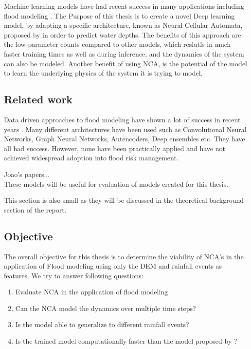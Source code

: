 Machine learning models have had recent success in many applications including flood modeling \cite{russo2023evaluation, karim2023review, chaudhary2022flood}. The Purpose of this thesis is to create a novel Deep learning model, by adapting a specific architecture, known as Neural Cellular Automata, proposed by \citeauthor{growing_nca} \cite{growing_nca} in order to predict water depths. The benefits of this approach are the low-parameter counts compared to other models, which reslutls in much faster training times as well as during inference, and the dynamics of the system can also be modeled. Another benefit of using NCA, is the potential of the model to learn the underlying physics of the system it is trying to model.

\subsection{Related work}
Data driven approaches to flood modeling have shown a lot of success in recent years \cite{russo2023evaluation, karim2023review, chaudhary2022flood}. Many different architectures have been used such as Convolutional Neural Networks, Graph Neural Networks, Autencoders, Deep ensembles etc. They have all had success. However, none have been practically applied and have not achieved widespread adoption into flood risk management. 

Joao's papers... \\

These models will be useful for evaluation of models created for this thesis.

This section is also small as they will be discussed in the theoretical background section of the report.

\subsection{Objective}
The overall objective for this thesis is to determine the viability of NCA's in the application of Flood modeling using only the DEM and rainfall events as features. We try to answer following questions:

\begin{enumerate}
	\item Evaluate NCA in the application of flood modeling 
	\item Can the NCA model the dynamics over multiple time steps?
	\item Is the model able to generalize to different rainfall events?
	\item Is the trained model computationally faster than the model proposed by \citeauthor{guidolin2016weighted}?
\end{enumerate}